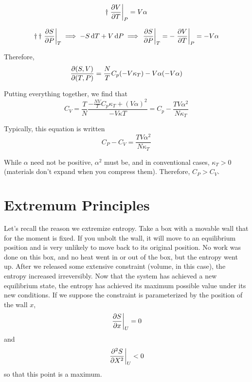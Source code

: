 \documentclass[a4paper,twoside,master.tex]{subfiles}
\begin{document}
\begin{equation}
    \dagger \eval{\pdv{V}{T}}_{P} = V \alpha
\end{equation}

\begin{equation}
    \dagger\dagger \eval{\pdv{S}{P}}_{T} \implies -S \dd{T} + V \dd{P} \implies \eval{\pdv{S}{P}}_{T} = -\eval{\pdv{V}{T}}_{P} = -V \alpha
\end{equation}

Therefore,
\begin{equation}
    \pdv{(S,V)}{(T,P)}= \frac{N}{T} C_p (-V \kappa_T) - V \alpha (- V \alpha)
\end{equation}

Putting everything together, we find that
\begin{equation}
    C_V = \frac{T}{N} \frac{- \frac{NV}{T} C_p \kappa_T + (V \alpha)^2}{-V \kappa T} = C_p - \frac{TV \alpha^2}{N \kappa_T}
\end{equation}

Typically, this equation is written
\begin{equation}
    C_P - C_V = \frac{TV \alpha^2}{N \kappa_T}
\end{equation}

While $ \alpha $ need not be positive, $ \alpha^2 $ must be, and in conventional cases, $ \kappa_T > 0 $ (materials don't expand when you compress them). Therefore, $ C_P > C_V $.


\section{Extremum Principles}
\label{sec:extremum_principles}

Let's recall the reason we extremize entropy. Take a box with a movable wall that for the moment is fixed. If you unbolt the wall, it will move to an equilibrium position and is very unlikely to move back to its original position. No work was done on this box, and no heat went in or out of the box, but the entropy went up. After we released some extensive constraint (volume, in this case), the entropy increased irreversibly. Now that the system has achieved a new equilibrium state, the entropy has achieved its maximum possible value under its new conditions. If we suppose the constraint is parameterized by the position of the wall $ x $,
\begin{equation}
    \eval{\pdv{S}{x}}_{U} = 0
\end{equation}
and
\begin{equation}
    \eval{\pdv[2]{S}{X}}_{U} < 0
\end{equation}
so that this point is a maximum.
\end{document}
